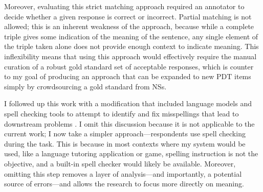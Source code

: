 Moreover, evaluating this strict matching approach required an annotator to decide whether a given response is correct or incorrect. Partial matching is not allowed; this is an inherent weakness of the approach, because while a complete triple gives some indication of the meaning of the sentence, any single element of the triple taken alone does not provide enough context to indicate meaning. This inflexibility means that using this approach would effectively require the manual curation of a robust gold standard set of acceptable responses, which is counter to my goal of producing an approach that can be expanded to new PDT items simply by crowdsourcing a gold standard from NSs.


I followed up this work with a modification that included language models and spell checking tools to attempt to identify and fix misspellings that lead to downstream problems \citep{king:dickinson:14}. I omit this discussion because it is not applicable to the current work; I now take a simpler approach---respondents use spell checking during the task. This is because in most contexts where my system would be used, like a language tutoring application or game, spelling instruction is not the objective, and a built-in spell checker would likely be available. Moreover, omitting this step removes a layer of analysis---and importantly, a potential source of errors---and allows the research to focus more directly on meaning.



